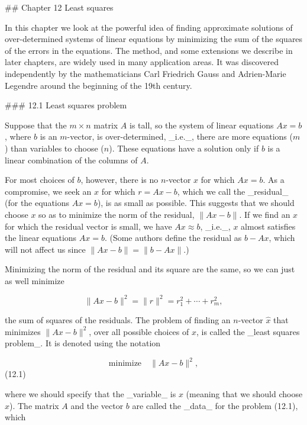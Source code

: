 

## Chapter 12 Least squares

In this chapter we look at the powerful idea of finding approximate solutions of over-determined systems of linear equations by minimizing the sum of the squares of the errors in the equations. The method, and some extensions we describe in later chapters, are widely used in many application areas. It was discovered independently by the mathematicians Carl Friedrich Gauss and Adrien-Marie Legendre around the beginning of the 19th century.

### 12.1 Least squares problem

Suppose that the \(m\times n\) matrix \(A\) is tall, so the system of linear equations \(Ax=b\), where \(b\) is an \(m\)-vector, is over-determined, _i.e._, there are more equations (\(m\)) than variables to choose (\(n\)). These equations have a solution only if \(b\) is a linear combination of the columns of \(A\).

For most choices of \(b\), however, there is no \(n\)-vector \(x\) for which \(Ax=b\). As a compromise, we seek an \(x\) for which \(r=Ax-b\), which we call the _residual_ (for the equations \(Ax=b\)), is as small as possible. This suggests that we should choose \(x\) so as to minimize the norm of the residual, \(\|Ax-b\|\). If we find an \(x\) for which the residual vector is small, we have \(Ax\approx b\), _i.e._, \(x\) almost satisfies the linear equations \(Ax=b\). (Some authors define the residual as \(b-Ax\), which will not affect us since \(\|Ax-b\|=\|b-Ax\|\).)

Minimizing the norm of the residual and its square are the same, so we can just as well minimize

\[\|Ax-b\|^{2}=\|r\|^{2}=r_{1}^{2}+\cdots+r_{m}^{2},\]

the sum of squares of the residuals. The problem of finding an \(n\)-vector \(\hat{x}\) that minimizes \(\|Ax-b\|^{2}\), over all possible choices of \(x\), is called the _least squares problem_. It is denoted using the notation

\[\mbox{minimize}\quad\|Ax-b\|^{2},\] (12.1)

where we should specify that the _variable_ is \(x\) (meaning that we should choose \(x\)). The matrix \(A\) and the vector \(b\) are called the _data_ for the problem (12.1), which